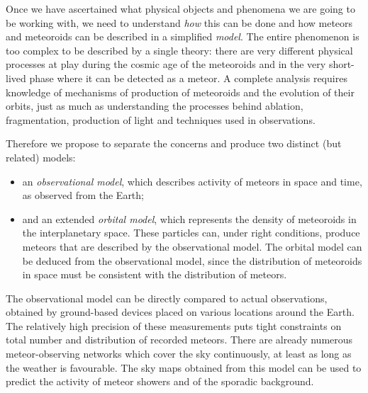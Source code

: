 
Once we have ascertained what physical objects and phenomena we are going to be working with,
we need to understand \emph{how} this can be done and how meteors and meteoroids can be described in a simplified \emph{model}.
The entire phenomenon is too complex to be described by a single theory: there are very different physical processes
at play during the cosmic age of the meteoroids and in the very short-lived phase where it can be detected as a meteor.
A complete analysis requires knowledge of mechanisms of production of meteoroids and the evolution of their orbits,
just as much as understanding the processes behind ablation, fragmentation, production of light and techniques used in observations.

Therefore we propose to separate the concerns and produce two distinct (but related) models:
\begin{itemize}
    \item an \emph{observational model}, which describes activity of meteors in space and time,
        as observed from the Earth;
    \item and an extended \emph{orbital model}, which represents the density of meteoroids in the interplanetary space.
        These particles can, under right conditions, produce meteors that are described by the observational model.
        The orbital model can be deduced from the observational model, since the distribution of meteoroids in space
        must be consistent with the distribution of meteors.
\end{itemize}

The observational model can be directly compared to actual observations, obtained by ground-based
devices placed on various locations around the Earth. The relatively high precision of these measurements puts
tight constraints on total number and distribution of recorded meteors. There are already numerous
meteor-observing networks which cover the sky continuously, at least as long as the weather is favourable.
The sky maps obtained from this model can be used to predict the activity of meteor showers and of the sporadic background.

